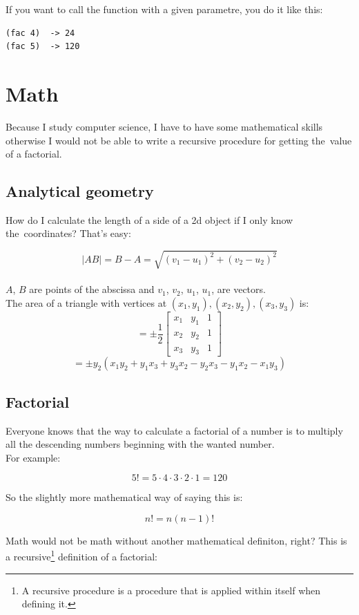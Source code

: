 \documentclass[titlepage, a4paper, 12pt]{article}
\begin{document}
If you want to call the function with a given parametre, you do it like this: 

\begin{lstlisting}
(fac 4)  -> 24
(fac 5)  -> 120
\end{lstlisting}
\newpage

\section{Math}
Because I study computer science, I have to have some mathematical skills otherwise I would not be able to write a recursive procedure for getting the~value of a factorial.

\subsection{Analytical geometry}
How do I calculate the length of a side of a 2d object if I only know the~coordinates? That's easy: 

$$|AB|= B-A = \sqrt{(v_1-u_1)^2 + (v_2-u_2)^2}$$\\
$A$, $B$ are points of the abscissa and $v_1$, $v_2$, $u_1$, $u_1$, are vectors.\\
The area of a triangle with vertices at $(x_1, y_1) , (x_2, y_2), (x_3, y_3)$ is:
$$=\pm\frac{1}{2}\begin{bmatrix} 
x_1 & y_1 & 1 \\
x_2 & y_2 & 1 \\  
x_3 & y_3 & 1
\end{bmatrix} 
$$
$$=\pm y_2(x_1y_2 + y_1x_3 +y_3x_2 - y_2x_3 - y_1x_2 - x_1y_3)$$


\subsection{Factorial}
Everyone knows that the way to calculate a factorial of a number is to multiply all the descending numbers beginning with the wanted number. \\
For example:

$$5! = 5\cdot4\cdot3\cdot2\cdot1=120$$

So the slightly more mathematical way of saying this is:

$$n! = n(n-1)! $$

Math would not be math without another mathematical definiton, right? 
This is a recursive\footnote{A recursive procedure is a procedure that is applied within itself when defining it.} definition of a factorial:
\end{document}
